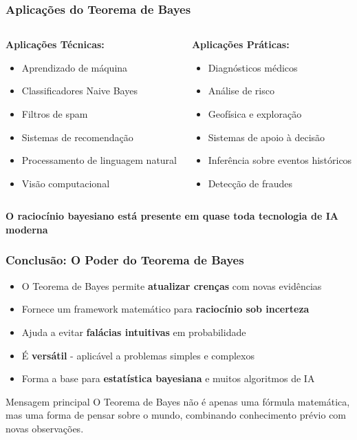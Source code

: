 \documentclass[11pt]{beamer}
\begin{document}
\begin{frame}
\frametitle{Aplicações do Teorema de Bayes}
\begin{columns}
\begin{column}{0.48\textwidth}
\textbf{Aplicações Técnicas:}
\begin{itemize}
\item Aprendizado de máquina
\item Classificadores Naive Bayes
\item Filtros de spam
\item Sistemas de recomendação
\item Processamento de linguagem natural
\item Visão computacional
\end{itemize}
\end{column}

\begin{column}{0.48\textwidth}
\textbf{Aplicações Práticas:}
\begin{itemize}
\item Diagnósticos médicos
\item Análise de risco
\item Geofísica e exploração
\item Sistemas de apoio à decisão
\item Inferência sobre eventos históricos
\item Detecção de fraudes
\end{itemize}
\end{column}
\end{columns}

\vspace{0.5cm}
\begin{center}
\textbf{O raciocínio bayesiano está presente em quase toda tecnologia de IA moderna}
\end{center}
\end{frame}

\begin{frame}
\frametitle{Conclusão: O Poder do Teorema de Bayes}
\begin{itemize}
\item O Teorema de Bayes permite \textbf{atualizar crenças} com novas evidências
\item Fornece um framework matemático para \textbf{raciocínio sob incerteza}
\item Ajuda a evitar \textbf{falácias intuitivas} em probabilidade
\item É \textbf{versátil} - aplicável a problemas simples e complexos
\item Forma a base para \textbf{estatística bayesiana} e muitos algoritmos de IA
\end{itemize}

\begin{block}{Mensagem principal}
O Teorema de Bayes não é apenas uma fórmula matemática, mas uma forma de pensar sobre o mundo, combinando conhecimento prévio com novas observações.
\end{block}
\end{frame}
\end{document}
